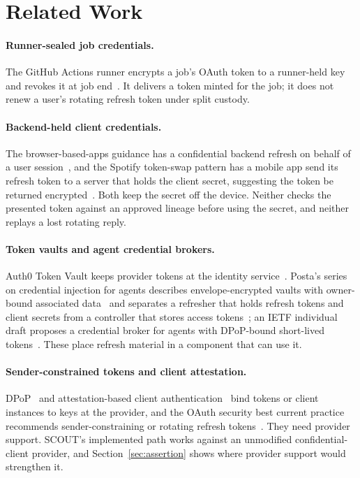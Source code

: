 \documentclass[11pt]{article}
\begin{document}
\section{Related Work}
\paragraph{Runner-sealed job credentials.} The GitHub Actions runner encrypts a job's OAuth token to a runner-held key and revokes it at job end~\cite{ghrunner}. It delivers a token minted for the job; it does not renew a user's rotating refresh token under split custody.

\paragraph{Backend-held client credentials.} The browser-based-apps guidance has a confidential backend refresh on behalf of a user session~\cite{bff}, and the Spotify token-swap pattern has a mobile app send its refresh token to a server that holds the client secret, suggesting the token be returned encrypted~\cite{spotify}. Both keep the secret off the device. Neither checks the presented token against an approved lineage before using the secret, and neither replays a lost rotating reply.

\paragraph{Token vaults and agent credential brokers.} Auth0 Token Vault keeps provider tokens at the identity service~\cite{auth0}. Posta's series on credential injection for agents describes envelope-encrypted vaults with owner-bound associated data~\cite{agentgateway} and separates a refresher that holds refresh tokens and client secrets from a controller that stores access tokens~\cite{posta}; an IETF individual draft proposes a credential broker for agents with DPoP-bound short-lived tokens~\cite{hartman}. These place refresh material in a component that can use it.

\paragraph{Sender-constrained tokens and client attestation.} DPoP~\cite{rfc9449} and attestation-based client authentication~\cite{attest} bind tokens or client instances to keys at the provider, and the OAuth security best current practice recommends sender-constraining or rotating refresh tokens~\cite{rfc9700}. They need provider support. SCOUT's implemented path works against an unmodified confidential-client provider, and Section~\ref{sec:assertion} shows where provider support would strengthen it.
\end{document}
